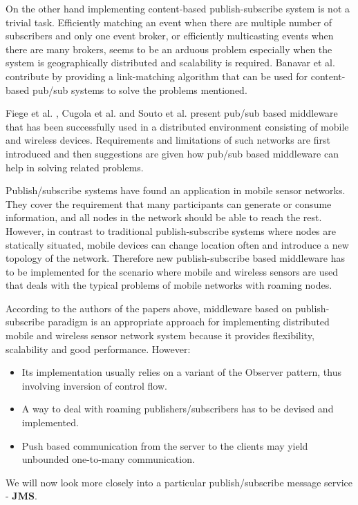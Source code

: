 \documentclass{sigplanconf}
\begin{document}
On the other hand implementing content-based publish-subscribe system is not a trivial task. Efficiently matching an event when there are multiple number of subscribers and only one event broker, or efficiently multicasting events when there are many brokers, seems to be an arduous problem especially when the system is geographically distributed and scalability is required. Banavar et al. \cite{pubsub1} contribute by providing a link-matching algorithm that can be used for content-based pub/sub systems to solve the problems mentioned.

Fiege et al. \cite{pubsub2}, Cugola et al. \cite{pubsub3} and Souto et al. \cite{pubsub5} present pub/sub based middleware that has been successfully used in a distributed environment consisting of mobile and wireless devices. Requirements and limitations of such networks are first introduced and then suggestions are given how pub/sub based middleware can help in solving related problems.

Publish/subscribe systems have found an application in mobile sensor networks. They cover the requirement that many participants can generate or consume information, and all nodes in the network should be able to reach the rest. However, in contrast to traditional publish-subscribe systems where nodes are statically situated, mobile devices can change location often and introduce a new topology of the network. Therefore new publish-subscribe based middleware has to be implemented for the scenario where mobile and wireless sensors are used that deals with the typical problems of mobile networks with roaming nodes.

According to the authors of the papers above, middleware based on publish-subscribe paradigm is an appropriate approach for implementing distributed mobile and wireless sensor network system because it provides flexibility, scalability and good performance. However:

\begin{itemize} \itemsep1pt \parskip0pt 
  \item Its implementation usually relies on a variant of the Observer pattern, thus involving inversion of control flow.
  \item A way to deal with roaming publishers/subscribers has to be devised and implemented.
  \item Push based communication from the server to the clients may yield unbounded one-to-many communication.
\end{itemize}
We will now look more closely into a particular publish/subscribe message service - \textbf{JMS}.
\end{document}
